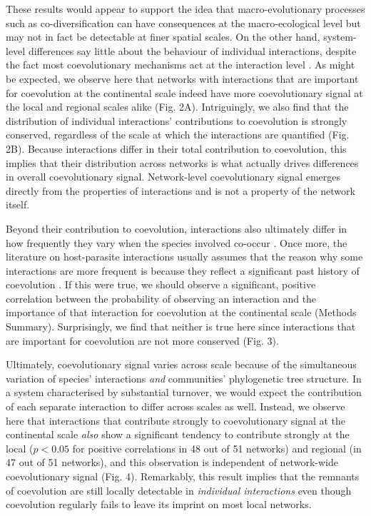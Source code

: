 \documentclass{pnastwo}
\begin{document}
\begin{article}
These results would appear to support the idea that macro-evolutionary
processes such as co-diversification can have consequences at the
macro-ecological level but may not in fact be detectable at finer
spatial scales. On the other hand, system-level differences say little
about the behaviour of individual interactions, despite the fact most
coevolutionary mechanisms act at the interaction level \cite{thom99}.
As might be expected, we observe here that networks with interactions
that are important for coevolution at the continental scale indeed have
more coevolutionary signal at the local and regional scales alike (Fig.
2A). Intriguingly, we also find that the distribution of individual
interactions' contributions to coevolution is strongly conserved,
regardless of the scale at which the interactions are quantified (Fig.
2B). Because interactions differ in their total contribution to
coevolution, this implies that their distribution across networks is
what actually drives differences in overall coevolutionary signal.
Network-level coevolutionary signal emerges directly from the properties
of interactions and is not a property of the network itself.

Beyond their contribution to coevolution, interactions also ultimately
differ in how frequently they vary when the species involved co-occur
\cite{olit14}. Once more, the literature on host-parasite interactions
usually assumes that the reason why some interactions are more frequent
is because they reflect a significant past history of coevolution
\cite{mora10}. If this were true, we should observe a significant,
positive correlation between the probability of observing an interaction
and the importance of that interaction for coevolution at the
continental scale (Methods Summary). Surprisingly, we find that neither
is true here since interactions that are important for coevolution are
not more conserved (Fig. 3).

Ultimately, coevolutionary signal varies across scale because of the
simultaneous variation of species' interactions \emph{and} communities'
phylogenetic tree structure. In a system characterised by substantial
turnover, we would expect the contribution of each separate interaction
to differ across scales as well. Instead, we observe here that
interactions that contribute strongly to coevolutionary signal at the
continental scale \emph{also} show a significant tendency to contribute
strongly at the local (\(p<0.05\) for positive correlations in 48 out of
51 networks) and regional (in 47 out of 51 networks), and this
observation is independent of network-wide coevolutionary signal (Fig.
4). Remarkably, this result implies that the remnants of coevolution are
still locally detectable in \emph{individual interactions} even though
coevolution regularly fails to leave its imprint on most local networks.


\end{article}
\end{document}
